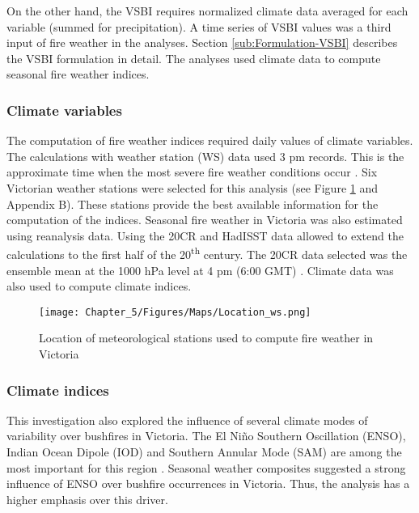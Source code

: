 On the other hand, the VSBI requires normalized climate data averaged
for each variable (summed for precipitation). A time series of VSBI
values was a third input of fire weather in the analyses. Section
\ref{sub:Formulation-VSBI} describes the VSBI formulation in detail.
The analyses used climate data to compute seasonal fire weather indices.


\subsubsection{Climate variables}

The computation of fire weather indices required daily values of climate
variables. The calculations with weather station (WS) data used 3
pm records. This is the approximate time when the most severe fire
weather conditions occur \citep{Lucas2010}. Six Victorian weather
stations were selected for this analysis (see Figure \ref{fig:Location of meteorological stations used to compute fire weather in Victoria}
and Appendix B). These stations provide the best available information
for the computation of the indices. Seasonal fire weather in Victoria
was also estimated using reanalysis data. Using the 20CR and HadISST
data allowed to extend the calculations to the first half of the 20\textsuperscript{th}
century. The 20CR data selected was the ensemble mean at the 1000
hPa level at 4 pm (6:00 GMT) . Climate data was also used to compute
climate indices.

\begin{figure}[h]
\noindent \begin{centering}
\texttt{[image: Chapter\_5/Figures/Maps/Location\_ws.png]}
\par\end{centering}

\caption[Location of meteorological stations used to compute fire weather in
Victoria]{Location of meteorological stations used to compute fire weather in
Victoria \label{fig:Location of meteorological stations used to compute fire weather in Victoria}}


\end{figure}



\subsubsection{Climate indices}

This investigation also explored the influence of several climate
modes of variability over bushfires in Victoria. The El Ni\~no Southern
Oscillation (ENSO), Indian Ocean Dipole (IOD) and Southern Annular
Mode (SAM) are among the most important for this region \citep{Gong1999,Williams2001,Cai2009,Risbey2009b,Ho2011,Ummenhofer2011,White2013}.
Seasonal weather composites suggested a strong influence of ENSO over
bushfire occurrences in Victoria. Thus, the analysis has a higher
emphasis over this driver. 

